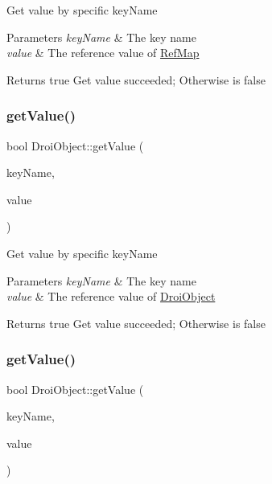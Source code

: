 Get value by specific key\+Name 
\begin{DoxyParams}{Parameters}
{\em key\+Name} & The key name \\
\hline
{\em value} & The reference value of \hyperlink{class_ref_map}{Ref\+Map} \\
\hline
\end{DoxyParams}
\begin{DoxyReturn}{Returns}
true Get value succeeded; Otherwise is false 
\end{DoxyReturn}
\mbox{\label{class_droi_object_a870c7a9bddf80f403d400faf0037500a}} 
\subsubsection{\texorpdfstring{get\+Value()}{getValue()}\hspace{0.1cm}{\footnotesize\ttfamily [10/11]}}
{\footnotesize\ttfamily bool Droi\+Object\+::get\+Value (\begin{DoxyParamCaption}\item[{const string \&}]{key\+Name,  }\item[{\hyperlink{class_droi_object}{Droi\+Object} $\ast$\&}]{value }\end{DoxyParamCaption})}

Get value by specific key\+Name 
\begin{DoxyParams}{Parameters}
{\em key\+Name} & The key name \\
\hline
{\em value} & The reference value of \hyperlink{class_droi_object}{Droi\+Object} \\
\hline
\end{DoxyParams}
\begin{DoxyReturn}{Returns}
true Get value succeeded; Otherwise is false 
\end{DoxyReturn}
\mbox{\label{class_droi_object_a2a62c9b8d44a9116206e1f72c20f667a}} 
\subsubsection{\texorpdfstring{get\+Value()}{getValue()}\hspace{0.1cm}{\footnotesize\ttfamily [11/11]}}
{\footnotesize\ttfamily bool Droi\+Object\+::get\+Value (\begin{DoxyParamCaption}\item[{const string \&}]{key\+Name,  }\item[{\hyperlink{class_droi_date_time}{Droi\+Date\+Time} \&}]{value }\end{DoxyParamCaption})}

